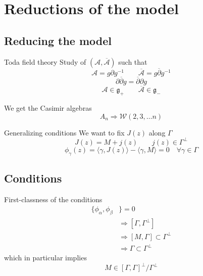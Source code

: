 \documentclass{beamer}
\begin{document}
\section{Reductions of the model}
\subsection{Reducing the model}


\begin{frame}{Toda field theory} \Large
    Study of $(\mathcal{A}, \overline{\mathcal{A}})$ such that 
    \begin{equation}
        \mathcal{A} = g\partial g^{-1} \qquad \overline{\mathcal{A}} = g\overline{\partial} g^{-1}
    \end{equation}
    \begin{equation}
        \partial \overline{\partial}g = \overline{\partial}\partial g
    \end{equation}
    \begin{equation}
        \mathcal{A} \in \mathfrak{g}_+\qquad \overline{\mathcal{A}} \in \mathfrak{g}_-
    \end{equation}

    We get the Casimir algebras
    \begin{equation}
        A_n \Rightarrow \mathcal{W}(2, 3, \dots n)
    \end{equation}
\end{frame}

\begin{frame}{Generalizing conditions} \LARGE
    We want to fix $J(z)$ along $\Gamma$
    \begin{equation}
        J(z) = M + j(z) \qquad j(z) \in \Gamma^{\perp}
    \end{equation}
    \begin{equation}
        \phi_\gamma(z) = \langle \gamma, J(z) \rangle - \langle \gamma, M \rangle = 0 \quad \forall \gamma \in \Gamma
    \end{equation}
\end{frame}

\subsection{Conditions}


\begin{frame}{First-classness of the conditions} \LARGE
    \begin{equation}
        \begin{aligned}
            \{\phi_\alpha, \phi_\beta&\} = 0 \\
            &\Rightarrow [\Gamma, \Gamma^\perp] \\
            &\Rightarrow [M, \Gamma] \subset \Gamma^\perp \\
            &\Rightarrow \Gamma \subset \Gamma^\perp 
        \end{aligned}
    \end{equation}
    which in particular implies
    \begin{equation}
        M \in [\Gamma, \Gamma]^\perp / \Gamma^\perp
    \end{equation}
\end{frame}
\end{document}
